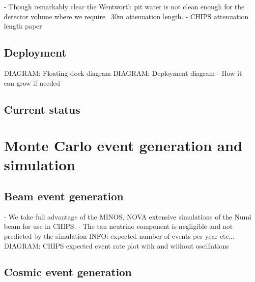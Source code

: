 - Though remarkably clear the Wentworth pit water is not clean enough for the detector volume
where we require ~30m attenuation length.
- CHIPS attenuation length paper~\cite{amat2017}

\subsection{Deployment} %
\label{sec:chips_detector_deployment} %

DIAGRAM: Floating dock diagram
DIAGRAM: Deployment diagram
- How it can grow if needed

\subsection{Current status} %
\label{sec:chips_detector_status} %

\section{Monte Carlo event generation and simulation} %
\label{sec:chips_monte_carlo} %

\subsection{Beam event generation} %
\label{sec:chips_monte_carlo_beam} %

- We take full advantage of the MINOS, NOVA extensive simulations of the Numi beam for use in
CHIPS.
- The tau neutrino component is negligible and not predicted by the simulation
INFO: expected number of events per year etc...
DIAGRAM: CHIPS expected event rate plot with and without oscillations

\subsection{Cosmic event generation} %
\label{sec:chips_monte_carlo_cosmic} %

